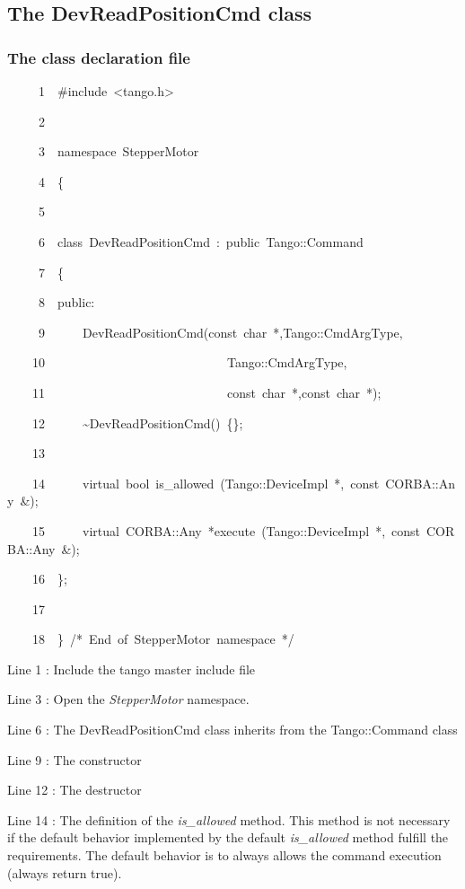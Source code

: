 \subsection{The DevReadPositionCmd class}


\subsubsection{The class declaration file}


\begin{lyxcode}
~~~~~1~~\#include~<tango.h>

~~~~~2~~

~~~~~3~~namespace~StepperMotor

~~~~~4~~\{

~~~~~5~~

~~~~~6~~class~DevReadPositionCmd~:~public~Tango::Command

~~~~~7~~\{

~~~~~8~~public:

~~~~~9~~~~~~DevReadPositionCmd(const~char~{*},Tango::CmdArgType,

~~~~10~~~~~~~~~~~~~~~~~~~~~~~~~~~~~Tango::CmdArgType,

~~~~11~~~~~~~~~~~~~~~~~~~~~~~~~~~~~const~char~{*},const~char~{*});

~~~~12~~~~~~\textasciitilde{}DevReadPositionCmd()~\{\};

~~~~13~~~~~~~~~~

~~~~14~~~~~~virtual~bool~is\_allowed~(Tango::DeviceImpl~{*},~const~CORBA::Any~\&);

~~~~15~~~~~~virtual~CORBA::Any~{*}execute~(Tango::DeviceImpl~{*},~const~CORBA::Any~\&);

~~~~16~~\};

~~~~17~~

~~~~18~~\}~/{*}~End~of~StepperMotor~namespace~{*}/
\end{lyxcode}


Line 1 : Include the tango master include file

Line 3 : Open the \emph{StepperMotor} namespace.

Line 6 : The DevReadPositionCmd class inherits from the Tango::Command
class

Line 9 : The constructor

Line 12 : The destructor

Line 14 : The definition of the \emph{is\_allowed}
method. This method is not necessary if the default behavior implemented
by the default \emph{is\_allowed} method fulfill the requirements.
The default behavior is to always allows the command execution (always
return true).

